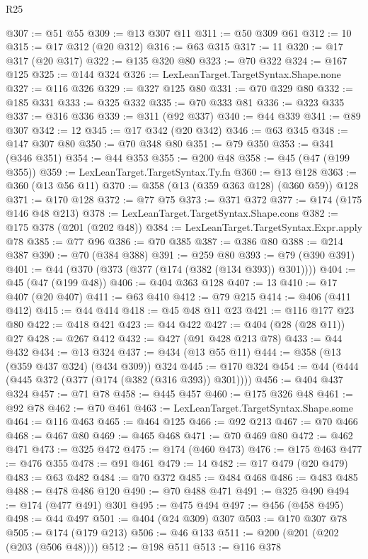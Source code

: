 \begin{lexlean}{R25}
\begin{coremodule}
@307 := @51 @55
@309 := @13 @307 @11
@311 := @50 @309 @61
@312 := 10
@315 := @17 @312 (@20 @312)
@316 := @63 @315
@317 := 11
@320 := @17 @317 (@20 @317)
@322 := @135 @320 @80
@323 := @70 @322
@324 := @167 @125
@325 := @144 @324
@326 := LexLeanTarget.TargetSyntax.Shape.none
@327 := @116 @326
@329 := @327 @125 @80
@331 := @70 @329 @80
@332 := @185 @331
@333 := @325 @332
@335 := @70 @333 @81
@336 := @323 @335
@337 := @316 @336
@339 := @311 (@92 @337)
@340 := @44 @339
@341 := @89 @307
@342 := 12
@345 := @17 @342 (@20 @342)
@346 := @63 @345
@348 := @147 @307 @80
@350 := @70 @348 @80
@351 := @79 @350
@353 := @341 (@346 @351)
@354 := @44 @353
@355 := @200 @48
@358 := @45 (@47 (@199 @355))
@359 := LexLeanTarget.TargetSyntax.Ty.fn
@360 := @13 @128
@363 := @360 (@13 @56 @11)
@370 := @358 (@13 (@359 @363 @128) (@360 @59)) @128
@371 := @170 @128
@372 := @77 @75
@373 := @371 @372
@377 := @174 (@175 @146 @48 @213)
@378 := LexLeanTarget.TargetSyntax.Shape.cons
@382 := @175 @378 (@201 (@202 @48))
@384 := LexLeanTarget.TargetSyntax.Expr.apply @78
@385 := @77 @96
@386 := @70 @385
@387 := @386 @80
@388 := @214 @387
@390 := @70 (@384 @388)
@391 := @259 @80
@393 := @79 (@390 @391)
@401 := @44 (@370 (@373 (@377 (@174 (@382 (@134 @393)) @301))))
@404 := @45 (@47 (@199 @48))
@406 := @404 @363 @128
@407 := 13
@410 := @17 @407 (@20 @407)
@411 := @63 @410
@412 := @79 @215
@414 := @406 (@411 @412)
@415 := @44 @414
@418 := @45 @48 @11 @23
@421 := @116 @177 @23 @80
@422 := @418 @421
@423 := @44 @422
@427 := @404 (@28 (@28 @11)) @27
@428 := @267 @412
@432 := @427 (@91 @428 @213 @78)
@433 := @44 @432
@434 := @13 @324
@437 := @434 (@13 @55 @11)
@444 := @358 (@13 (@359 @437 @324) (@434 @309)) @324
@445 := @170 @324
@454 := @44 (@444 (@445 @372 (@377 (@174 (@382 (@316 @393)) @301))))
@456 := @404 @437 @324
@457 := @71 @78
@458 := @445 @457
@460 := @175 @326 @48
@461 := @92 @78
@462 := @70 @461
@463 := LexLeanTarget.TargetSyntax.Shape.some
@464 := @116 @463
@465 := @464 @125
@466 := @92 @213
@467 := @70 @466
@468 := @467 @80
@469 := @465 @468
@471 := @70 @469 @80
@472 := @462 @471
@473 := @325 @472
@475 := @174 (@460 @473)
@476 := @175 @463
@477 := @476 @355
@478 := @91 @461
@479 := 14
@482 := @17 @479 (@20 @479)
@483 := @63 @482
@484 := @70 @372
@485 := @484 @468
@486 := @483 @485
@488 := @478 @486 @120
@490 := @70 @488 @471
@491 := @325 @490
@494 := @174 (@477 @491) @301
@495 := @475 @494
@497 := @456 (@458 @495)
@498 := @44 @497
@501 := @404 (@24 @309) @307
@503 := @170 @307 @78
@505 := @174 (@179 @213)
@506 := @46 @133
@511 := @200 (@201 (@202 (@203 (@506 @48))))
@512 := @198 @511
@513 := @116 @378

\end{coremodule}
\end{lexlean}
